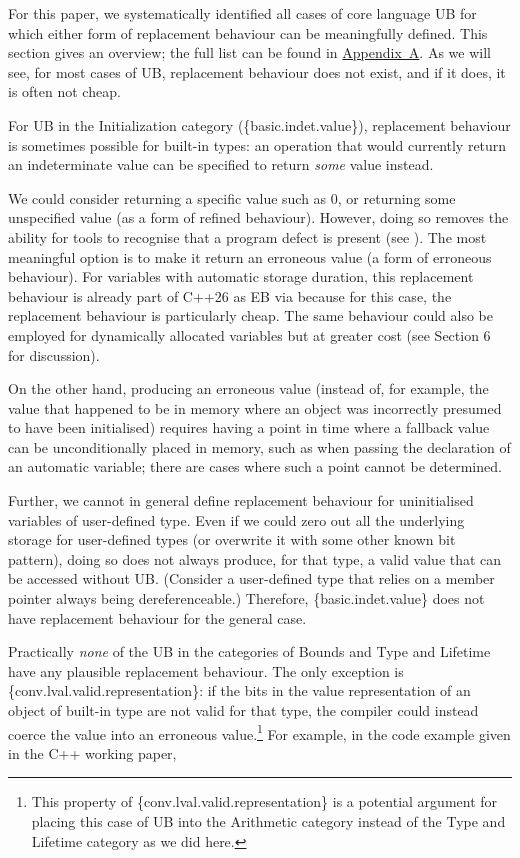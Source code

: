 {For this paper, we systematically identified all cases of core language UB for which either form of replacement behaviour can be meaningfully defined. This section gives an overview; the full list can be found in \hyperref[appendix]{Appendix~A}. As we will see, for most cases of UB, replacement behaviour does not exist, and if it does, it is often not cheap.

For UB in the Initialization category (\{basic.indet.value\}), replacement behaviour is sometimes possible for built-in types: an operation that would currently return an indeterminate value can be specified to return \emph{some} value instead.


We could consider returning a specific value such as 0, or returning some unspecified value (as a form of refined behaviour). However, doing so removes the ability for tools to recognise that a program defect is present (see \cite{P2754R0}). The most meaningful option is to make it return an erroneous value (a form of erroneous behaviour). For variables with automatic storage duration, this replacement behaviour is already part of C++26 as EB via \cite{P2795R5} because for this case, the replacement behaviour is particularly cheap. The same  behaviour could also be employed for dynamically allocated variables but at greater cost (see \cite{P2723R1} Section 6 for discussion).

On the other hand, producing an erroneous value (instead of, for example, the value that happened to be in memory where an object was incorrectly presumed to have been initialised) requires having a point in time where a fallback value can be unconditionally placed in memory, such as when passing the declaration of an automatic variable; there are cases where such a point cannot be determined.

Further, we cannot in general define replacement behaviour for uninitialised variables of user-defined type. Even if we could zero out all the underlying storage for user-defined types (or overwrite it with some other known bit pattern), doing so does not always produce, for that type, a valid value that can be accessed without UB. (Consider a user-defined type that relies on a member pointer always being dereferenceable.) Therefore, \{basic.indet.value\} does not have replacement behaviour for the general case.



Practically \emph{none} of the UB in the categories of Bounds and Type and Lifetime have any plausible replacement behaviour. The only exception is \{conv.lval.valid.representation\}: if the bits in the value representation of an object of built-in type are not valid for that type, the compiler could instead coerce the value into an erroneous value.\footnote{This property of \{conv.lval.valid.representation\} is a potential argument for placing this case of UB into the Arithmetic category instead of the Type and Lifetime category as we did here.} For example, in the code example given in the C++ working paper,



}
